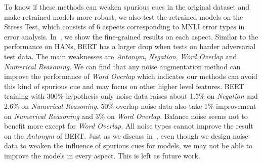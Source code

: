 To know
if these methods can weaken spurious cues in the original dataset 
and make retrained models
more robust, we also test the retrained models on the Stress Test, 
which consists of 6 aspects corresponding to MNLI error 
types in error analysis. In~, we show the fine-grained results 
on each aspect. Similar to the performance on HANs, BERT has a larger drop when 
tests on harder adversarial test data. The main weaknesses are \textit{Antonym}, 
\textit{Negation}, \textit{ Word Overlap} and \textit{Numerical Reasoning}. 
We can find that any noise augmentation method can improve the performance of 
\textit{ Word Overlap} which indicates our methods can avoid this kind of spurious
cue and may focus on other higher level features. BERT training with 
300\% hypothesis-only noise data raises about 1.5\% on \textit{Negation} and 2.6\% 
on \textit{Numerical Reasoning}. 50\% overlap noise data also take 1\% improvement 
on  \textit{Numerical Reasoning} and 3\% on \textit{ Word Overlap}. Balance noise 
seems not to benefit more except for \textit{ Word Overlap}. All noise types cannot 
improve the result on the \textit{Antonym} of BERT.
Just as we discuss in~, even though we design noise data 
to weaken the influence of spurious cues for models, we may not be able 
to improve the models in every aspect. This is left as future work.

